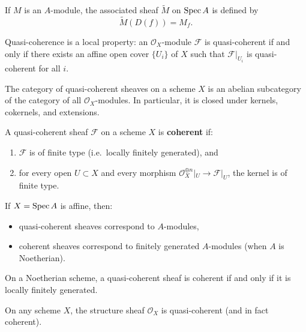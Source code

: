 \documentclass[12pt]{article}
\begin{document}
\begin{definition}
    If $M$ is an $A$-module, the associated sheaf $\widetilde{M}$ on $\operatorname{Spec} A$ is defined by
    \[
        \widetilde{M}(D(f)) = M_f.
    \]
\end{definition}

\begin{proposition}
    Quasi-coherence is a local property: an $\mathcal O_X$-module $\mathcal F$ is quasi-coherent if and only if there exists an affine open cover $\{U_i\}$ of $X$ such that $\mathcal F|_{U_i}$ is quasi-coherent for all $i$.
\end{proposition}

\begin{proposition}
    The category of quasi-coherent sheaves on a scheme $X$ is an abelian subcategory of the category of all $\mathcal O_X$-modules. In particular, it is closed under kernels, cokernels, and extensions.
\end{proposition}

\begin{definition}
    A quasi-coherent sheaf $\mathcal F$ on a scheme $X$ is \textbf{coherent} if:
    \begin{enumerate}
        \item $\mathcal F$ is of finite type (i.e.\ locally finitely generated), and
        \item for every open $U \subset X$ and every morphism $\mathcal O_X^{\oplus n}|_U \to \mathcal F|_U$, the kernel is of finite type.
    \end{enumerate}
\end{definition}

\begin{proposition}
    If $X=\operatorname{Spec} A$ is affine, then:
    \begin{itemize}
        \item quasi-coherent sheaves correspond to $A$-modules,
        \item coherent sheaves correspond to finitely generated $A$-modules (when $A$ is Noetherian).
    \end{itemize}
\end{proposition}

\begin{remark}
    On a Noetherian scheme, a quasi-coherent sheaf is coherent if and only if it is locally finitely generated.
\end{remark}
\begin{example}
    On any scheme $X$, the structure sheaf $\mathcal{O}_X$ is quasi-coherent (and in fact coherent).
\end{example}
\end{document}
